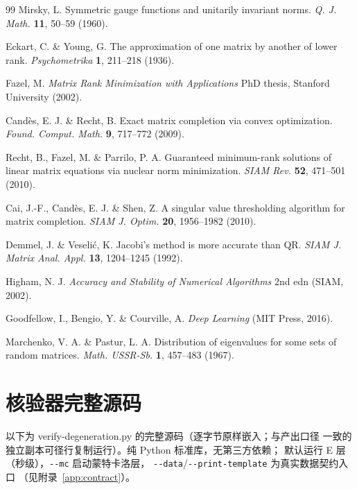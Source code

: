 \documentclass[UTF8,11pt,a4paper]{ctexart}
\theoremstyle{plain}
\theoremstyle{definition}
\theoremstyle{remark}
\begin{document}
\begin{thebibliography}{99}
 Mirsky, L.
Symmetric gauge functions and unitarily invariant norms.
\emph{Q. J. Math.} \textbf{11}, 50--59 (1960).

 Eckart, C. \& Young, G.
The approximation of one matrix by another of lower rank.
\emph{Psychometrika} \textbf{1}, 211--218 (1936).

 Fazel, M.
\emph{Matrix Rank Minimization with Applications} PhD thesis, Stanford University (2002).

 Cand\`es, E. J. \& Recht, B.
Exact matrix completion via convex optimization.
\emph{Found. Comput. Math.} \textbf{9}, 717--772 (2009).

 Recht, B., Fazel, M. \& Parrilo, P. A.
Guaranteed minimum-rank solutions of linear matrix equations via nuclear norm
minimization. \emph{SIAM Rev.} \textbf{52}, 471--501 (2010).

 Cai, J.-F., Cand\`es, E. J. \& Shen, Z.
A singular value thresholding algorithm for matrix completion.
\emph{SIAM J. Optim.} \textbf{20}, 1956--1982 (2010).

 Demmel, J. \& Veseli\'c, K.
Jacobi's method is more accurate than QR.
\emph{SIAM J. Matrix Anal. Appl.} \textbf{13}, 1204--1245 (1992).

 Higham, N. J.
\emph{Accuracy and Stability of Numerical Algorithms} 2nd edn (SIAM, 2002).

 Goodfellow, I., Bengio, Y. \& Courville, A.
\emph{Deep Learning} (MIT Press, 2016).

 Marchenko, V. A. \& Pastur, L. A.
Distribution of eigenvalues for some sets of random matrices.
\emph{Math. USSR-Sb.} \textbf{1}, 457--483 (1967).

\end{thebibliography}

\appendix
\section{核验器完整源码}\label{app:code}

以下为 \textsf{verify-degeneration.py} 的完整源码（逐字节原样嵌入；与产出口径
一致的独立副本可径行复制运行）。纯 Python 标准库，无第三方依赖；
默认运行 E 层（秒级），\texttt{-{}-mc} 启动蒙特卡洛层，
\texttt{-{}-data}/\texttt{-{}-print-template} 为真实数据契约入口
（见附录~\ref{app:contract}）。
\end{document}
